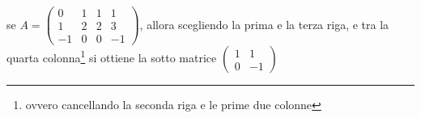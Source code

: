 \begin{teorema}
\begin{osservazione}
  \end{osservazione}
  \begin{esempio}
    se $A=
    \begin{pmatrix}
      0 & 1 & 1 &1 \\
      1 & 2 & 2 & 3 \\
      -1 & 0 &0 & -1
    \end{pmatrix}
    $, allora scegliendo la prima e la terza riga, e tra la quarta colonna\footnote{ovvero cancellando la seconda
    riga e le prime due colonne} si ottiene la sotto matrice $
  \begin{pmatrix}
    1 &1 \\
    0 & -1 
  \end{pmatrix}
  $
  \end{esempio}
\end{teorema}
    